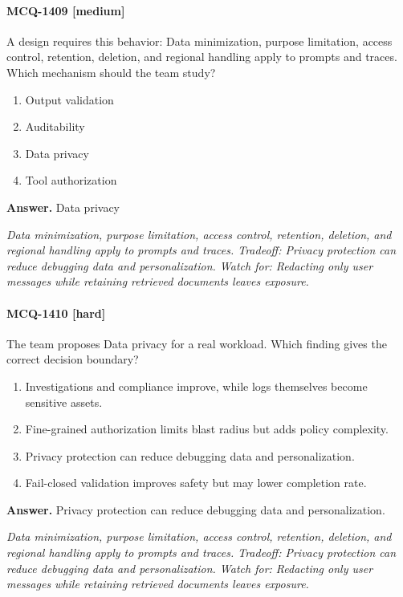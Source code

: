 \paragraph{MCQ-1409 [medium]} A design requires this behavior: Data minimization, purpose limitation, access control, retention, deletion, and regional handling apply to prompts and traces. Which mechanism should the team study?
\begin{enumerate}[label=\Alph*.]
\item Output validation
\item Auditability
\item Data privacy
\item Tool authorization
\end{enumerate}
\noindent\textbf{Answer.} Data privacy
\par\textit{Data minimization, purpose limitation, access control, retention, deletion, and regional handling apply to prompts and traces. Tradeoff: Privacy protection can reduce debugging data and personalization. Watch for: Redacting only user messages while retaining retrieved documents leaves exposure.}
\paragraph{MCQ-1410 [hard]} The team proposes Data privacy for a real workload. Which finding gives the correct decision boundary?
\begin{enumerate}[label=\Alph*.]
\item Investigations and compliance improve, while logs themselves become sensitive assets.
\item Fine-grained authorization limits blast radius but adds policy complexity.
\item Privacy protection can reduce debugging data and personalization.
\item Fail-closed validation improves safety but may lower completion rate.
\end{enumerate}
\noindent\textbf{Answer.} Privacy protection can reduce debugging data and personalization.
\par\textit{Data minimization, purpose limitation, access control, retention, deletion, and regional handling apply to prompts and traces. Tradeoff: Privacy protection can reduce debugging data and personalization. Watch for: Redacting only user messages while retaining retrieved documents leaves exposure.}

